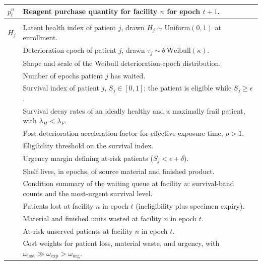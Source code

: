 \documentclass[preprint,review,12pt,nonatbib]{elsarticle}
\providecommand{\DIFadd}[1]{{\protect\color{blue}#1}} %
\providecommand{\DIFaddFL}[1]{\DIFadd{#1}} %
\providecommand{\DIFaddbeginFL}{} %
\providecommand{\DIFaddendFL}{} %
\providecommand{\DIFaddincludegraphics}[2][]{{\color{blue}\fbox{\DIFOincludegraphics[#1]{#2}}}} %
\DeclareRobustCommand{\DIFaddbeginFL}{\DIFOaddbeginFL \let\includegraphics\DIFaddincludegraphics} %
\DeclareRobustCommand{\DIFaddendFL}{\DIFOaddendFL \let\includegraphics\DIFOincludegraphics} %
\begin{document}
\begin{table}[htbp]
\begin{tabularx}{\textwidth}{>{\raggedright\arraybackslash}p{} >{\raggedright\arraybackslash}X}
$p_t^n$ & Reagent purchase quantity for facility $n$ for epoch $t+1$. \\
\DIFaddbeginFL \midrule
\multicolumn{2}{c}{\textbf{\DIFaddFL{Patient-condition and perishability}}} \\
\midrule
\DIFaddFL{$H_j$ }& \DIFaddFL{Latent health index of patient $j$, drawn $H_j \sim \mathrm{Uniform}(0,1)$ at enrollment. }\\
\DIFaddFL{$\tau_j$ }& \DIFaddFL{Deterioration epoch of patient $j$, drawn $\tau_j \sim \theta\,\mathrm{Weibull}(\kappa)$. }\\
\DIFaddFL{$\kappa,\theta$ }& \DIFaddFL{Shape and scale of the Weibull deterioration-epoch distribution. }\\
\DIFaddFL{$\alpha_j$ }& \DIFaddFL{Number of epochs patient $j$ has waited. }\\
\DIFaddFL{$S_j$ }& \DIFaddFL{Survival index of patient $j$, $S_j \in [0,1]$; the patient is eligible while $S_j \ge \epsilon$. }\\
\DIFaddFL{$\lambda_H,\lambda_F$ }& \DIFaddFL{Survival decay rates of an ideally healthy and a maximally frail patient, with $\lambda_H < \lambda_F$. }\\
\DIFaddFL{$\rho$ }& \DIFaddFL{Post-deterioration acceleration factor for effective exposure time, $\rho > 1$. }\\
\DIFaddFL{$\epsilon$ }& \DIFaddFL{Eligibility threshold on the survival index. }\\
\DIFaddFL{$\delta$ }& \DIFaddFL{Urgency margin defining at-risk patients ($S_j < \epsilon + \delta$). }\\
\DIFaddFL{$\ell_{\mathrm{mat}},\ell_{\mathrm{fin}}$ }& \DIFaddFL{Shelf lives, in epochs, of source material and finished product. }\\
\DIFaddFL{$\boldsymbol{\sigma}_t^n$ }& \DIFaddFL{Condition summary of the waiting queue at facility $n$: survival-band counts and the most-urgent survival level. }\\
\DIFaddFL{$\phi_t^n$ }& \DIFaddFL{Patients lost at facility $n$ in epoch $t$ (ineligibility plus specimen expiry). }\\
\DIFaddFL{$\psi_t^n$ }& \DIFaddFL{Material and finished units wasted at facility $n$ in epoch $t$. }\\
\DIFaddFL{$\upsilon_t^n$ }& \DIFaddFL{At-risk unserved patients at facility $n$ in epoch $t$. }\\
\DIFaddFL{$\omega_{\mathrm{lost}},\omega_{\mathrm{exp}},\omega_{\mathrm{urg}}$ }& \DIFaddFL{Cost weights for patient loss, material waste, and urgency, with $\omega_{\mathrm{lost}} \gg \omega_{\mathrm{exp}} > \omega_{\mathrm{urg}}$. }\\
\DIFaddendFL \bottomrule
\end{tabularx}
\end{table}
\end{document}
